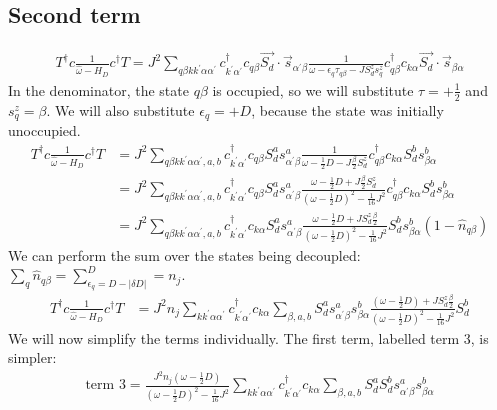 \documentclass{revtex4-2}
\numberwithin{equation}{section}
\begin{document}
\subsection{Second term}
\begin{align}
	T^\dagger c \frac{1}{\hat \omega - H_D}c^\dagger T = J^2\sum_{q\beta k k^\prime \alpha \alpha^\prime} c^\dagger_{k^\prime\alpha^\prime} c_{q\beta} \vec{S_d}\cdot\vec{s}_{\alpha^\prime \beta } \frac{1}{\omega - \epsilon_q\tau_{q\beta} - J S_d^z s_q^z}c^\dagger_{q\beta} c_{k\alpha} \vec{S_d}\cdot\vec{s}_{ \beta\alpha}
\end{align}
In the denominator, the state \(q\beta\) is occupied, so we will substitute \(\tau = + \frac{1}{2}\) and \(s_q^z = \beta\). We will also substitute \(\epsilon_q = +D\), because the state was initially unoccupied.
\begin{align}
	T^\dagger c \frac{1}{\hat \omega - H_D}c^\dagger T &= J^2\sum_{q\beta k k^\prime \alpha \alpha^\prime,a,b} c^\dagger_{k^\prime\alpha^\prime} c_{q\beta} S_d^a s^a_{\alpha^\prime \beta} \frac{1}{\omega - \frac{1}{2}D - J \frac{\beta}{2}S_d^z}c^\dagger_{q\beta} c_{k\alpha} S_d^b s^b_{\beta \alpha} \\
	&= J^2\sum_{q\beta k k^\prime \alpha \alpha^\prime,a,b} c^\dagger_{k^\prime\alpha^\prime} c_{q\beta} S_d^a s^a_{\alpha^\prime \beta} \frac{\omega - \frac{1}{2}D + J \frac{\beta}{2}S_d^z }{\left(\omega - \frac{1}{2}D\right)^2 - \frac{1}{16}J^2}c^\dagger_{q\beta} c_{k\alpha} S_d^b s^b_{\beta \alpha} \\
	&= J^2\sum_{q\beta k k^\prime \alpha \alpha^\prime,a,b} c^\dagger_{k^\prime\alpha^\prime} c_{k\alpha} S_d^a s^a_{\alpha^\prime \beta} \frac{\omega - \frac{1}{2}D  +  J S_d^z \frac{\beta}{2}}{\left(\omega - \frac{1}{2}D\right)^2 - \frac{1}{16}J^2} S_d^b s^b_{\beta \alpha} \left(1 - \hat n_{q\beta}\right)
\end{align}
We can perform the sum over the states being decoupled: \(\sum_q \hat n_{q\beta} = \sum_{\epsilon_q = D - |\delta D|}^D = n_j \).
\begin{align}
	T^\dagger c \frac{1}{\hat \omega - H_D}c^\dagger T &= J^2 n_j \sum_{k k^\prime \alpha \alpha^\prime} c^\dagger_{k^\prime\alpha^\prime} c_{k\alpha} \sum_{\beta,a,b}S_d^a s^a_{\alpha^\prime \beta}s^b_{\beta \alpha} \frac{\left(\omega - \frac{1}{2}D\right) + J S_d^z \frac{\beta}{2}}{\left(\omega - \frac{1}{2}D\right)^2 - \frac{1}{16}J^2} S_d^b
\end{align}
We will now simplify the terms individually. The first term, labelled term 3, is simpler:
\begin{equation}\begin{aligned}
	\label{term3_def}
	\text{term 3} = \frac{J^2 n_j \left(\omega - \frac{1}{2}D\right)}{\left(\omega - \frac{1}{2}D\right)^2 - \frac{1}{16}J^2}\sum_{k k^\prime \alpha \alpha^\prime} c^\dagger_{k^\prime\alpha^\prime} c_{k\alpha} \sum_{\beta,a,b}S_d^a S_d^b s^a_{\alpha^\prime \beta}s^b_{\beta \alpha}
\end{aligned}\end{equation}
\end{document}
